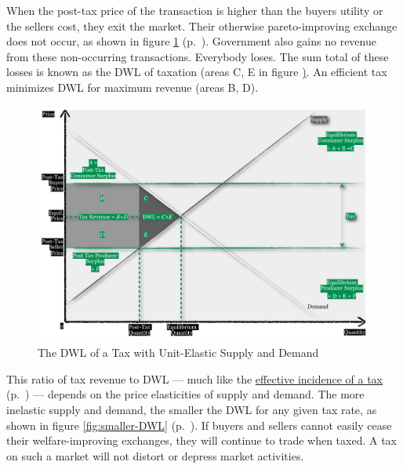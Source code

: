 When the post-tax price of the transaction is higher than the buyers utility or the sellers cost, they exit the market. Their otherwise pareto-improving exchange does not occur, as shown in figure \ref{fig:DWL} (p.~\pageref{fig:DWL}). Government also gains no revenue from these non-occurring transactions. Everybody loses. The sum total of these losses is known as the \gls{DWL} of taxation (areas C, E in figure \href{fig:DWL}). An efficient tax minimizes \gls{DWL} for maximum revenue (areas B, D).

\begin{figure}[htbp]
	\centering
	\includegraphics[width=1\textwidth]{./img/DWL}  
	\caption[Deadweight-Loss of a Tax with Unit-Elastic Supply and Demand]{The \gls{DWL} of a Tax with Unit-Elastic Supply and Demand}
	\label{fig:DWL}
\end{figure}

This ratio of tax revenue to \gls{DWL} --- much like the \hyperref[sec:well-determinedincidence]{effective incidence of a tax} (p.~\pageref{sec:well-determinedincidence}) --- depends on the price elasticities of supply and demand. The more inelastic supply and demand, the smaller the \gls{DWL} for any given tax rate, as shown in figure \ref{fig:smaller-DWL} (p.~\pageref{fig:smaller-DWL}). If buyers and sellers cannot easily cease their welfare-improving exchanges, they will continue to trade when taxed. A tax on such a market will not distort or depress market activities.

